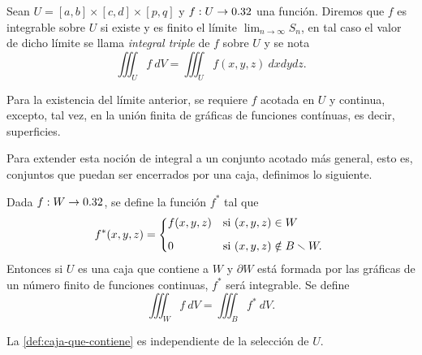 \begin{definition} 
    Sean $U=[a,b]\times[c,d]\times[p,q]$ y $f:U\to0.32$ una funci\'on.  Diremos que $f$ es integrable sobre $U$ si existe y es finito el  l\'imite $\lim_{n\to\infty}S_n$, en tal caso  el valor de dicho l\'imite  se llama \emph{integral triple} de $f$ sobre $U$ y se nota 
    \[
          \iiint_U f\:dV=\iiint_U f(x,y,z)\:dxdydz.
    \]
\end{definition}

\begin{obs}
Para la existencia del límite anterior, se requiere $f$ acotada en $U$ y continua, excepto, tal vez, en la unión finita de gráficas de funciones 
contínuas, es decir, superficies.
\end{obs}


Para extender esta noci\'on de integral a un conjunto acotado m\'as general, esto es, conjuntos que puedan ser encerrados por una caja, definimos lo siguiente. 

\begin{definition}\label{def:caja-que-contiene}
Dada $f:W\to0.32$, se define la funci\'on $f^*$ tal que
\[
    f^*(x,y,z)=
    \begin{dcases*}
        f(x,y,z) & si $(x,y,z)\in W$ \\[.2cm]
        0        & si $(x,y,z)\notin B\smallsetminus W.$
    \end{dcases*}
\]
Entonces si $U$ es una caja que contiene a $W$ y $\partial W$ est\'a formada por las gr\'aficas de un n\'umero finito de funciones continuas, $f^*$ ser\'a integrable.  Se define
\[
    \iiint_W f\:dV=\iiint_B f^*\:dV.  
\]
\end{definition}

\begin{obs} 
   La \autoref{def:caja-que-contiene} es independiente de la selecci\'on de $U$.
\end{obs}

